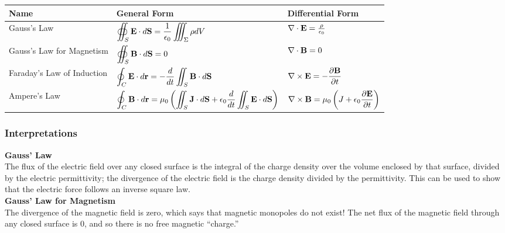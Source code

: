 \begin{center}
\begin{footnotesize}
\begin{adjustbox}{width=\textwidth}
\begin{tabular}[htbp]{lll}
    \toprule
    \textbf{Name} & \textbf{General Form} & \textbf{Differential Form} \\ \midrule
    Gauss's Law & \(\displaystyle \oiint_{S} \mathbf{E} \cdot d\mathbf{S} = \frac{1}{\epsilon_{0}} \iiint_{\Sigma} \rho dV\) & \(\nabla \cdot \mathbf{E} = \frac{\rho}{\epsilon_{0}}\) \\ \midrule
    Gauss's Law for Magnetism & \(\displaystyle \oiint_{S} \mathbf{B} \cdot d\mathbf{S} = 0\) & \(\nabla \cdot \mathbf{B} = 0\) \\ \midrule
    Faraday's Law of Induction & \(\displaystyle \oint_{C} \mathbf{E} \cdot d\mathbf{r} = -\frac{d}{dt} \iint_{S} \mathbf{B} \cdot d\mathbf{S}\) & \(\displaystyle \nabla \times \mathbf{E} = -\frac{\partial \mathbf{B}}{\partial t}\) \\ \midrule
    Ampere's Law & \(\displaystyle \oint_{C} \mathbf{B} \cdot d\mathbf{r} = \mu_{0}\left(\iint_{S}\mathbf{J} \cdot d\mathbf{S} + \epsilon_{0} \frac{d}{dt} \iint_{S} \mathbf{E} \cdot d\mathbf{S}\right)\) & \(\displaystyle \nabla \times \mathbf{B} = \mu_{0} \left(J + \epsilon_{0} \frac{\partial \mathbf{E}}{\partial t}\right)\) \\ \bottomrule
\end{tabular}
\end{adjustbox}
\end{footnotesize}
\end{center}

\subsubsection{Interpretations}

\textbf{Gauss' Law} \\

The flux of the electric field over any closed surface is the integral of the charge density over the volume enclosed by that surface, divided by the electric permittivity; the divergence of the electric field is the charge density divided by the permittivity. This can be used to show that the electric force follows an inverse square law. \\

\textbf{Gauss' Law for Magnetism} \\

The divergence of the magnetic field is zero, which says that magnetic monopoles do not exist! The net flux of the magnetic field through any closed surface is 0, and so there is no free magnetic “charge.” \\

